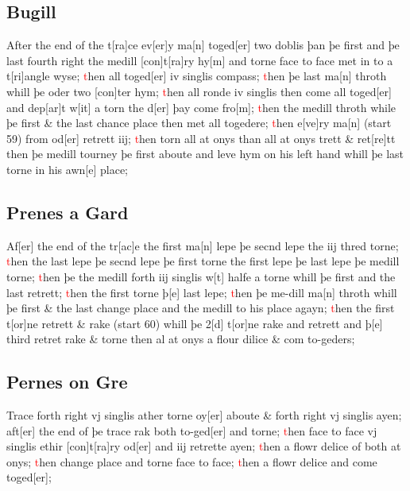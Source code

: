 \documentclass[12pt,letter]{article} %
\newcommand{\red}[1]{\textcolor{red}{#1}}
\newcommand{\srcpg}[1]{(start #1)}
\begin{document}
\subsection{Bugill}
After the end of the t{[}ra{]}ce ev{[}er{]}y ma{[}n{]} toged{[}er{]} two
doblis þan þe first and þe last fourth right the medill
{[}con{]}t{[}ra{]}ry hy{[}m{]} and torne face to face met in to a
t{[}ri{]}angle wyse; \red{t}hen all toged{[}er{]} iv singlis compass; \red{t}hen þe
last ma{[}n{]} throth whill þe oder two {[}con{]}ter hym; \red{t}hen all ronde
iv singlis then come all toged{[}er{]} and dep{[}ar{]}t w{[}it{]} a torn
the d{[}er{]} þay come fro{[}m{]}; \red{t}hen the medill throth while þe first
\& the last chance place then met all togedere; \red{t}hen e{[}ve{]}ry
ma{[}n{]} \srcpg{59} from od{[}er{]} retrett iij; \red{t}hen torn all at onys
than all at onys trett \& ret{[}re{]}tt then þe medill tourney þe first
aboute and leve hym on his left hand whill þe last torne in his
awn{[}e{]} place;

\subsection{Prenes a Gard}
Af{[}er{]} the end of the tr{[}ac{]}e the first ma{[}n{]} lepe þe secnd
lepe the iij thred torne; \red{t}hen the last lepe þe secnd lepe þe first
torne the first lepe þe last lepe þe medill torne; \red{t}hen þe the medill
forth iij singlis w{[}t{]} halfe a torne whill þe first and the last
retrett; \red{t}hen the first torne þ{[}e{]} last lepe; \red{t}hen þe me-dill
ma{[}n{]} throth whill þe first \& the last change place and the medill
to his place agayn; \red{t}hen the first t{[}or{]}ne retrett \& rake \srcpg{60}
whill þe 2{[}d{]} t{[}or{]}ne rake and retrett and þ{[}e{]} third retret
rake \& torne then al at onys a flour dilice \& com to-geders;

\subsection{Pernes on Gre}
Trace forth right vj singlis ather torne oy{[}er{]} aboute \& forth right
vj singlis ayen; aft{[}er{]} the end of þe trace rak both to-ged{[}er{]}
and torne; \red{t}hen face to face vj singlis  ethir {[}con{]}t{[}ra{]}ry
od{[}er{]} and iij retrette ayen; \red{t}hen a flowr delice of both at onys;
\red{t}hen change place and torne face to face; \red{t}hen a flowr delice and come
toged{[}er{]};
\end{document}
